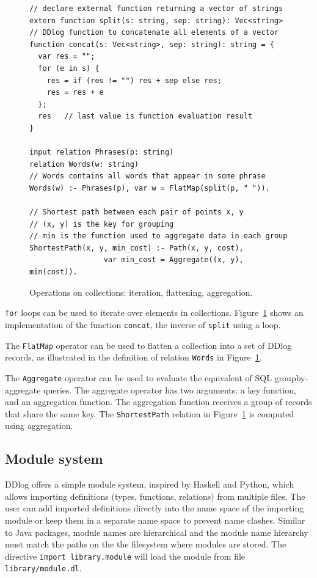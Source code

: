 \begin{figure}[t]
  \footnotesize
  \begin{lstlisting}[language=ddlog]
// declare external function returning a vector of strings
extern function split(s: string, sep: string): Vec<string>
// DDlog function to concatenate all elements of a vector
function concat(s: Vec<string>, sep: string): string = {
  var res = "";
  for (e in s) {
    res = if (res != "") res + sep else res;
    res = res + e
  };
  res   // last value is function evaluation result
}

input relation Phrases(p: string)
relation Words(w: string)
// Words contains all words that appear in some phrase
Words(w) :- Phrases(p), var w = FlatMap(split(p, " ")).

// Shortest path between each pair of points x, y
// (x, y) is the key for grouping
// min is the function used to aggregate data in each group
ShortestPath(x, y, min_cost) :- Path(x, y, cost),
                 var min_cost = Aggregate((x, y), min(cost)).
\end{lstlisting}
\caption{Operations on collections: iteration, flattening,
  aggregation.\label{fig:collections}}
\end{figure}

\texttt{for} loops can be used to iterate over elements in
collections.  Figure~\ref{fig:collections} shows an implementation of
the function \texttt{concat}, the inverse of \texttt{split} using a
loop.

The \texttt{FlatMap} operator can be used to flatten
a collection into a set of DDlog records, as illustrated in the definition of
relation \texttt{Words} in Figure~\ref{fig:collections}.

The \texttt{Aggregate} operator can be used to evaluate the equivalent
of SQL groupby-aggregate queries.  The aggregate operator has two
arguments: a key function, and an aggregation function.  The
aggregation function receives a group of
records that share the same key.  The
\texttt{ShortestPath} relation in Figure~\ref{fig:collections} is
computed using aggregation.

\subsection{Module system}

DDlog offers a simple module system, inspired by Haskell and Python,
which allows importing definitions (types, functions, relations) from
multiple files.  The user can add imported definitions directly into the
name space of the importing module or keep them in a separate name space to
prevent name clashes.  Similar to Java packages, module names are
hierarchical and the module name hierarchy must match the paths on the
the filesystem where modules are stored.  The directive \texttt{import
  library.module} will load the module from file
\texttt{library/module.dl}.

